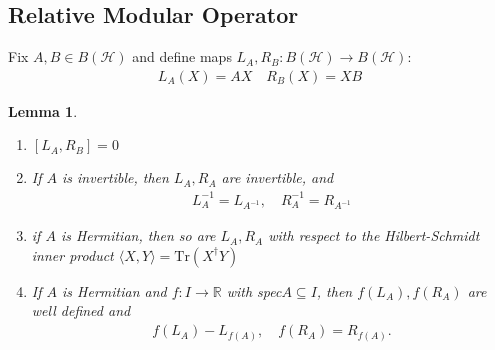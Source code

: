 \documentclass[notoc]{tufte-book}
\newtheorem{lemma}[theorem]{Lemma}
\begin{document}
\subsection{Relative Modular Operator}
Fix $A,B \in B(\mathcal{H})$ and define maps $L_A, R_B: B(\mathcal{H})\rightarrow B(\mathcal{H})$:
\begin{align}
    L_A(X) = AX \quad R_B(X) = XB
\end{align}
\begin{tcolorbox}[colframe=white,breakable, colback=black!5, arc=0pt, outer arc=0pt]
\begin{lemma}
\begin{enumerate}
    \item $[L_A,R_B]=0$
    \item If $A$ is invertible, then $L_A,R_A$ are invertible, and 
    \begin{align}
        L_A^{-1} = L_{A^{-1}}, \quad R^{-1}_A = R_{A^{-1}}
    \end{align}
    \item if $A$ is Hermitian, then so are $L_A,R_A$ with respect to the Hilbert-Schmidt inner product $\langle X,Y \rangle = \text{Tr}(X^{\dagger} Y)$
    \item If $A$ is Hermitian and $f:I\rightarrow \mathbb{R}$ with spec$A\subseteq I$, then $f(L_A), f(R_A)$ are well defined and 
    \begin{align}
        f(L_A)-L_{f(A)}, \quad f(R_A)=R_{f(A)}.
    \end{align}
\end{enumerate}
\end{lemma}
\end{tcolorbox}
\end{document}
